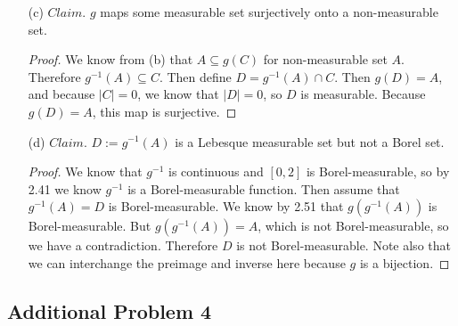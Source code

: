 \documentclass[12pt]{article}
\def\Q{\mathbb{Q}}
\begin{document}
\begin{itemize}
    $Claim.$ $g(C)$ contains a non-measurable set $A$.

    \begin{proof}
        Define the relation on [0,2] by $x \sim x' \iff (x - x') \in \Q$. Then construct the set of equivalence classes $\{ [x] : [x] \cap g(C) \neq \emptyset \}$ For each element of this set, chose a representative in $g(C)$ using the axiom of choice. Let $A$ be the set of these representatives. If we assume that $A$ is measurable, we can say that $$g(c) \subseteq \bigsqcup_{r \in \Q \cup [-2,2]} (A+r) \subseteq (-2, 4).$$ We know that $|g(C)| = 1$, and for all $r \in \Q \cap [-2, 2]$, we know $|A| = |A + r|$. Therefore $$1 =|g(c)| \leq \sum_{r \in \Q \cap [-2,2]} |A| \leq |(-2, 4)| = 6.$$ But then $|A|$ must be nonzero for the sum to be at least 1, but then the sum diverges because it is an infinite sum of nonzero numbers. Therefore we have a contradiction, and $A$ is not measurable.
    \end{proof}

    \item[(c)] $Claim.$ $g$ maps some measurable set surjectively onto a non-measurable set.
    
    \begin{proof}
        We know from (b) that $A \subseteq g(C)$ for non-measurable set $A$. Therefore $g^{-1}(A) \subseteq C$. Then define $D = g^{-1}(A) \cap C$. Then $g(D) = A$, and because $|C| = 0$, we know that $|D| = 0$, so $D$ is measurable. Because $g(D) = A$, this map is surjective.
    \end{proof}

    \item[(d)] $Claim.$ $D := g^{-1} (A)$ is a Lebesque measurable set but not a Borel set.
    
    \begin{proof}
        We know that $g^{-1}$ is continuous and $[0,2]$ is Borel-measurable, so by 2.41 we know $g^{-1}$ is a Borel-measurable function. Then assume that $g^{-1} (A) = D$ is Borel-measurable. We know by 2.51 that $g(g^{-1} (A))$ is Borel-measurable. But $g(g^{-1} (A)) = A$, which is not Borel-measurable, so we have a contradiction. Therefore $D$ is not Borel-measurable. Note also that we can interchange the preimage and inverse here because $g$ is a bijection.
    \end{proof}
\end{itemize}

\subsection*{Additional Problem 4}
\end{document}
